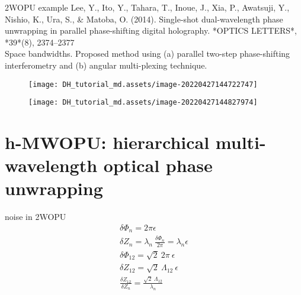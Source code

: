 \documentclass[t, aspectratio=169]{beamer}
\begin{document}


\begin{frame}[allowframebreaks]{2WOPU example}
Lee, Y., Ito, Y., Tahara, T., Inoue, J., Xia, P., Awatsuji, Y., Nishio, K., Ura, S., \& Matoba, O. (2014). Single-shot dual-wavelength phase unwrapping in parallel phase-shifting digital holography. *OPTICS LETTERS*, *39*(8), 2374–2377 \\
Space bandwidths. Proposed method using (a) parallel two-step phase-shifting interferometry and (b) angular multi-plexing technique.
	\begin{figure}
		\texttt{[image: DH\_tutorial\_md.assets/image-20220427144722747]}
	\end{figure}
	\begin{figure}
		\texttt{[image: DH\_tutorial\_md.assets/image-20220427144827974]}
	\end{figure}
\end{frame}


\section{h-MWOPU: hierarchical multi-wavelength optical phase unwrapping}
\begin{frame}[c]
	\centering\LARGE\textbf{\secname}
\end{frame}


\begin{frame}{noise in 2WOPU}
	\begin{gather*}
\delta\Phi_n = 2\pi\epsilon \\
\delta Z_n = \lambda_n\ \frac{\delta\Phi_n}{2\pi} = \lambda_n\epsilon \\
\delta\Phi_{12} = \sqrt{2}\ 2\pi\ \epsilon \\
\delta Z_{12} = \sqrt{2}\ \Lambda_{12}\ \epsilon \\
\frac{\delta Z_{12}}{\delta Z_n} = \frac{\sqrt{2}\ \Lambda_{12}}{\lambda_n}
	\end{gather*}
\end{frame}
\end{document}
